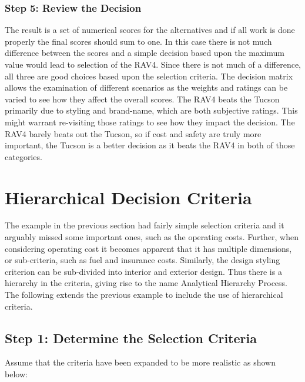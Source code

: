 \subsubsection*{Step 5: Review the Decision}

The result is a set of numerical scores for the alternatives and if all
work is done properly the final scores should sum to one. In this case
there is not much difference between the scores and a simple decision
based upon the maximum value would lead to selection of the RAV4. Since
there is not much of a difference, all three are good choices based upon
the selection criteria. The decision matrix allows the examination of
different scenarios as the weights and ratings can be varied to see how
they affect the overall scores. The RAV4 beats the Tucson primarily due
to styling and brand-name, which are both subjective ratings. This might
warrant re-visiting those ratings to see how they impact the decision.
The RAV4 barely beats out the Tucson, so if cost and safety are truly
more important, the Tucson is a better decision as it beats the RAV4 in
both of those categories.

\section{Hierarchical Decision Criteria}
\label{section:hierarchical-decision-criteria}

The example in the previous section had fairly simple selection criteria
and it arguably missed some important ones, such as the operating costs.
Further, when considering operating cost it becomes apparent that it has
multiple dimensions, or sub-criteria, such as fuel and insurance costs.
Similarly, the design styling criterion can be sub-divided into interior
and exterior design. Thus there is a hierarchy in the criteria, giving
rise to the name Analytical Hierarchy Process. The following extends the
previous example to include the use of hierarchical criteria.

\subsection*{Step 1: Determine the Selection Criteria}

Assume that the criteria have been expanded to be more realistic as
shown below:

